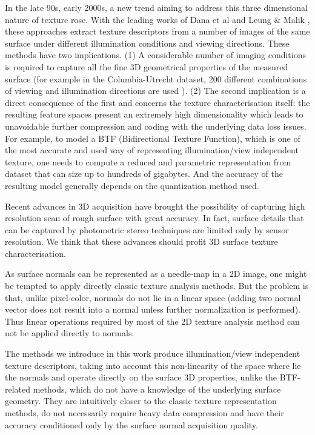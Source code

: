 In the late 90s, early 2000s, a new trend aiming to address this three dimensional nature of texture rose. With the leading works of Dana et al \cite{Dana:1999} and Leung \& Malik \cite{Leung:2001}, these approaches extract texture descriptors from a number of images of the same surface under different illumination conditions and viewing directions. These methods have two implications. (1) A considerable number of imaging conditions is required to capture all the fine 3D geometrical properties of the measured surface (for example in the Columbia-Utrecht dataset, 200 different combinations of viewing and
illumination directions are used \cite{Dana:1999}). (2) The second implication is a direct consequence of the first and concerns the texture characterisation itself: the resulting feature spaces present an extremely high dimensionality which leads to unavoidable further compression and coding with the underlying data loss issues. For example, to model a BTF (Bidirectional Texture Function), which is one of the most accurate and used way of representing illumination/view independent texture, one needs to compute a reduced and parametric representation from dataset that can size up to hundreds of gigabytes. And the accuracy of the resulting model generally depends on the quantization method used.

Recent advances in 3D acquisition have brought the possibility of capturing high resolution scan of rough surface with great accuracy. In fact, surface details that can be captured by photometric stereo techniques are limited only by sensor resolution. We think that these advances should profit 3D surface texture characterisation. 

As surface normals can be represented as a needle-map in a 2D image, one might be tempted to apply directly classic texture analysis methods. But the problem is that, unlike pixel-color, normals do not lie in a linear space (adding two normal vector does not result into a normal unless further normalization is performed). Thus linear operations required by most of the 2D texture analysis method can not be applied directly to normals. 

The methods we introduce in this work produce illumination/view independent texture descriptors, taking into account this non-linearity of the space where lie the normals and operate directly on the surface 3D properties, unlike the BTF-related methods, which do not have a knowledge of the underlying surface geometry. They are intuitively closer to the classic texture representation methods, do not necessarily require heavy data compression and have their accuracy conditioned only by the surface normal acquisition quality.
 

